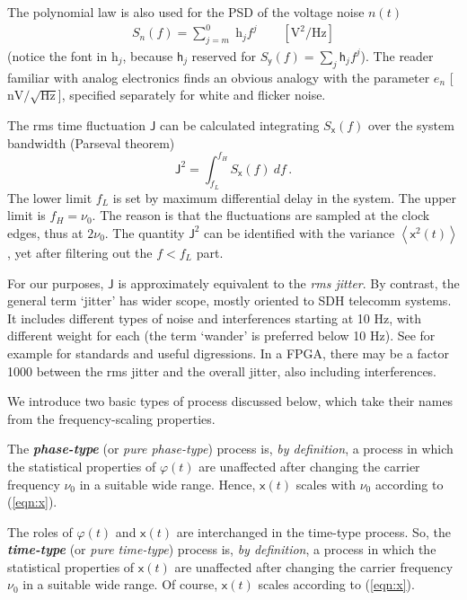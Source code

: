\documentclass{article}
\newcommand{\unit}[1]{\ensuremath{\mathrm{#1}}}
\newcommand{\req}[1]{(\ref{#1})}
\begin{document}
The polynomial law is also used for the PSD of the voltage noise $n(t)$
\begin{align}
S_n(f)=\sum_{j=m}^{0}\;\mathrm{h}_jf^j\qquad\unit{[V^2\!/Hz]}
\end{align}
(notice the font in $\mathrm{h}_j$, because $\mathsf{h}_j$ reserved for $S_\mathsf{y}(f)=\sum_{j}\mathsf{h}_jf^j$). 
The reader familiar with analog electronics finds an obvious analogy with the parameter $e_n$ [\unit{nV/\sqrt{Hz}}], specified separately for white and flicker noise.

The rms time fluctuation $\mathsf{J}$ can be calculated integrating $S_\mathsf{x}(f)$ over the system bandwidth (Parseval theorem)
\begin{equation}
\mathsf{J}^2=\int_{f_L}^{f_H}S_\mathsf{x}(f)\:df\,.
\label{eqn:fluctuation-J} 
\end{equation}
The lower limit $f_L$ is set by maximum differential delay in the system. 
The upper limit is $f_H=\nu_0$.  The reason is that the fluctuations are sampled at the clock edges, thus at $2\nu_0$.
The quantity $\mathsf{J}^2$ can be identified with the variance $\left<\mathsf{x}^2(t)\right>$, yet after filtering out the $f<f_L$ part. 

For our purposes, $\mathsf{J}$ is approximately equivalent to the \emph{rms jitter}.  By contrast, the general term `jitter' has wider scope, mostly oriented to SDH telecomm systems.  It includes different types of noise and interferences starting at 10 Hz, with different weight for each (the term `wander' is preferred below 10 Hz). See for example \cite{G.8252,Li-2008,Reinhardt-2005} for standards and useful digressions.  In a FPGA, there may be a factor 1000 between the rms jitter and the overall jitter, also including interferences.

We introduce two basic types of process discussed below, which take their names from the frequency-scaling properties.

The \emph{\bfseries phase-type} (or \emph{pure phase-type}) process is, \emph{by definition}, a process in which the statistical properties of $\varphi(t)$ are unaffected after changing the carrier frequency $\nu_0$ in a suitable wide range.  
Hence, $\mathsf{x}(t)$ scales with $\nu_0$ according to \req{eqn:x}.  

The roles of $\varphi(t)$ and $\mathsf{x}(t)$ are interchanged in the time-type process.  
So, the \emph{\bfseries time-type} (or \emph{pure time-type}) process is, \emph{by definition}, a process in which the statistical properties of $\mathsf{x}(t)$ are unaffected after changing the carrier frequency $\nu_0$ in a suitable wide range.  
Of course, $\mathsf{x}(t)$ scales according to \req{eqn:x}.
\end{document}
